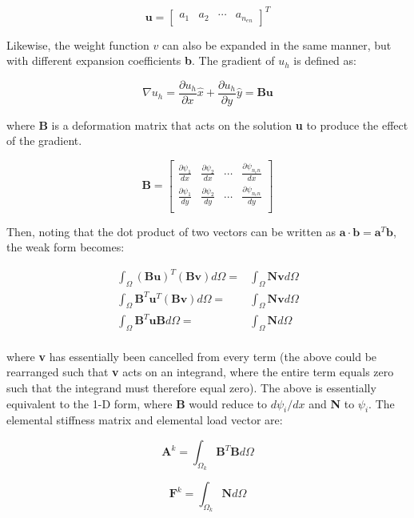 \documentclass[10pt]{article}
\newcommand{\beq}{\begin{equation}}
\newcommand{\eeq}{\end{equation}}
\newcommand{\beqa}{\begin{equation}\begin{aligned}}
\newcommand{\eeqa}{\end{aligned}\end{equation}}
\begin{document}
\beq
\textbf{u}=\begin{bmatrix} a_1 & a_2 & \cdots & a_{n_{en}}\end{bmatrix}^T
\eeq

Likewise, the weight function \(v\) can also be expanded in the same manner, but with different expansion coefficients \textbf{b}. The gradient of \(u_h\) is defined as:

\beq
\nabla u_h=\frac{\partial u_h}{\partial x}\hat{x}+\frac{\partial u_h}{\partial y}\hat{y}=\textbf{B}\textbf{u}
\eeq

where \textbf{B} is a deformation matrix that acts on the solution \textbf{u} to produce the effect of the gradient. 

\beq
\textbf{B}=\begin{bmatrix}
\frac{\partial\psi_1}{dx} & \frac{\partial\psi_2}{dx} & \cdots & \frac{\partial\psi_{n_en}}{dx}\\
\frac{\partial\psi_1}{dy} & \frac{\partial\psi_2}{dy} & \cdots & \frac{\partial\psi_{n_en}}{dy}\\
\end{bmatrix}
\eeq

Then, noting that the dot product of two vectors can be written as \(\textbf{a}\cdot\textbf{b}=\textbf{a}^T\textbf{b}\), the weak form becomes:

\beqa
\int_\Omega (\textbf{B}\textbf{u})^T(\textbf{B}\textbf{v})d\Omega=&\int_\Omega \textbf{N}\textbf{v}d\Omega\\
\int_\Omega \textbf{B}^T\textbf{u}^T(\textbf{B}\textbf{v})d\Omega=&\int_\Omega \textbf{N}\textbf{v}d\Omega\\
\int_\Omega \textbf{B}^T\textbf{u}\textbf{B}d\Omega=&\int_\Omega \textbf{N}d\Omega\\
\eeqa

where \textbf{v} has essentially been cancelled from every term (the above could be rearranged such that \textbf{v} acts on an integrand, where the entire term equals zero such that the integrand must therefore equal zero). The above is essentially equivalent to the 1-D form, where \textbf{B} would reduce to \(d\psi_i/dx\) and \textbf{N} to \(\psi_i\). The elemental stiffness matrix and elemental load vector are:

\beq
\label{eq:20}
\textbf{A}^k=\int_{\Omega_k} \textbf{B}^T\textbf{B}d\Omega
\eeq

\beq
\label{eq:21}
\textbf{F}^k=\int_{\Omega_k} \textbf{N}d\Omega
\eeq
\end{document}
